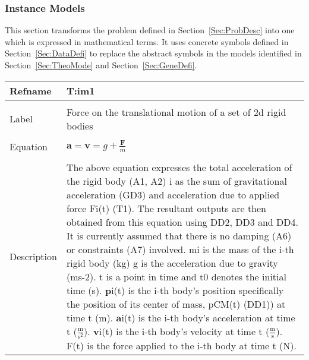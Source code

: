\documentclass[12pt]{article}
\begin{document}
\subsubsection{Instance Models}
\label{Sec:InstMode}
This section transforms the problem defined in Section~\ref{Sec:ProbDesc} into one which is expressed in mathematical terms. It uses concrete symbols defined in Section~\ref{Sec:DataDefi} to replace the abstract symbols in the models identified in Section~\ref{Sec:TheoMode} and Section~\ref{Sec:GeneDefi}.
~\newline
\noindent \begin{minipage}{\textwidth}
\begin{tabular}{p{} p{}}
\toprule \textbf{Refname} & \textbf{T:im1}
\label{T:im1}
\\ \midrule \\
Label & Force on the translational motion of a set of 2d rigid bodies
\\ \midrule \\
Equation & $\mathbf{a}=\mathbf{v}=g+\frac{\mathbf{F}}{m}$
\\ \midrule \\
Description & The above equation expresses the total acceleration of the rigid body (A1, A2) i as the sum of gravitational acceleration (GD3) and acceleration due to applied force Fi(t) (T1). The resultant outputs are then obtained from this equation using DD2, DD3 and DD4. It is currently assumed that there is no damping (A6) or constraints (A7) involved. mi is the mass of the i-th rigid body (kg) g is the acceleration due to gravity (ms-2). t is a point in time and t0 denotes the initial time (s). $\mathbf{p}$i(t) is the i-th body's position specifically the position of its center of mass, pCM(t) (DD1)) at time t (m). $\mathbf{a}$i(t) is the i-th body's acceleration at time t ($\frac{\text{m}}{\text{s}^{2}}$). $\mathbf{v}$i(t) is the i-th body's velocity at time t ($\frac{\text{m}}{\text{s}}$). F(t) is the force applied to the i-th body at time t (N).
\\ \bottomrule \end{tabular}
\end{minipage}\\
~\newline
\end{document}
